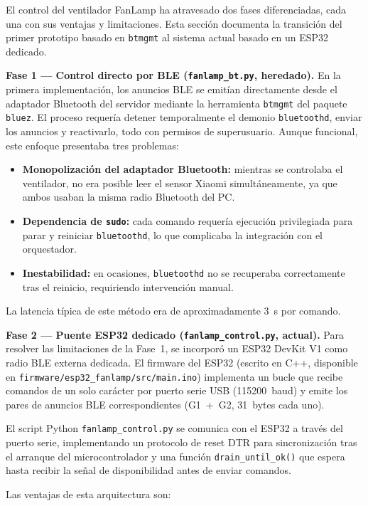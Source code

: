 El control del ventilador FanLamp ha atravesado dos fases diferenciadas, cada una con sus ventajas y limitaciones. Esta sección documenta la transición del primer prototipo basado en \texttt{btmgmt} al sistema actual basado en un ESP32 dedicado.

\textbf{Fase 1 --- Control directo por BLE (\texttt{fanlamp\_bt.py}, heredado).} En la primera implementación, los anuncios BLE se emitían directamente desde el adaptador Bluetooth del servidor mediante la herramienta \texttt{btmgmt} del paquete \texttt{bluez}. El proceso requería detener temporalmente el demonio \texttt{bluetoothd}, enviar los anuncios y reactivarlo, todo con permisos de superusuario. Aunque funcional, este enfoque presentaba tres problemas:

\begin{itemize}
    \item \textbf{Monopolización del adaptador Bluetooth:} mientras se controlaba el ventilador, no era posible leer el sensor Xiaomi simultáneamente, ya que ambos usaban la misma radio Bluetooth del PC.
    \item \textbf{Dependencia de \texttt{sudo}:} cada comando requería ejecución privilegiada para parar y reiniciar \texttt{bluetoothd}, lo que complicaba la integración con el orquestador.
    \item \textbf{Inestabilidad:} en ocasiones, \texttt{bluetoothd} no se recuperaba correctamente tras el reinicio, requiriendo intervención manual.
\end{itemize}

La latencia típica de este método era de aproximadamente 3~s por comando.

\textbf{Fase 2 --- Puente ESP32 dedicado (\texttt{fanlamp\_control.py}, actual).} Para resolver las limitaciones de la Fase~1, se incorporó un ESP32 DevKit V1 como radio BLE externa dedicada. El firmware del ESP32 (escrito en C++, disponible en \texttt{firmware/esp32\_fanlamp/src/main.ino}) implementa un bucle que recibe comandos de un solo carácter por puerto serie USB (115200~baud) y emite los pares de anuncios BLE correspondientes (G1~+~G2, 31~bytes cada uno).

El script Python \texttt{fanlamp\_control.py} se comunica con el ESP32 a través del puerto serie, implementando un protocolo de reset DTR para sincronización tras el arranque del microcontrolador y una función \texttt{drain\_until\_ok()} que espera hasta recibir la señal de disponibilidad antes de enviar comandos.

Las ventajas de esta arquitectura son:

